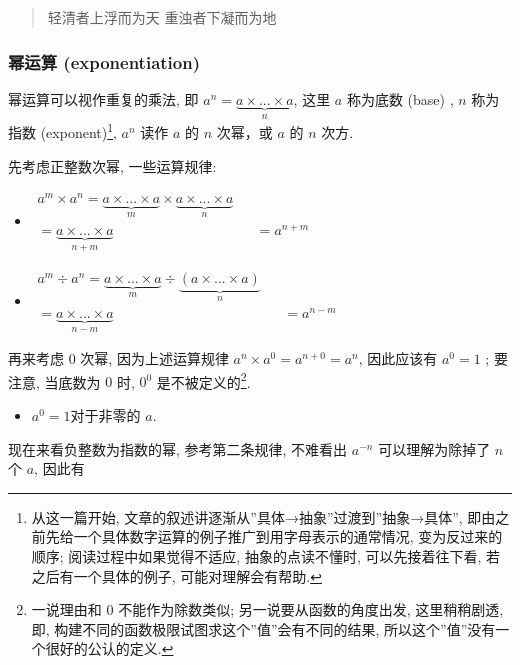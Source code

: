 \begin{quote}
轻清者上浮而为天 重浊者下凝而为地
\end{quote}

\hypertarget{ux5e42ux8fd0ux7b97-exponentiation}{%
\subsubsection{幂运算
(exponentiation)}\label{ux5e42ux8fd0ux7b97-exponentiation}}

幂运算可以视作重复的乘法, 即
\(a^n=\underbrace{a\times ...\times a}_{n}\), 这里 \(a\) 称为底数 (base)
, \(n\) 称为指数 (exponent)\footnote{从这一篇开始,
  文章的叙述讲逐渐从''具体→抽象''过渡到''抽象→具体'',
  即由之前先给一个具体数字运算的例子推广到用字母表示的通常情况,
  变为反过来的顺序; 阅读过程中如果觉得不适应, 抽象的点读不懂时,
  可以先接着往下看, 若之后有一个具体的例子, 可能对理解会有帮助.},
\(a^n\) 读作 \(a\) 的 \(n\) 次幂，或 \(a\) 的 \(n\) 次方.

先考虑正整数次幂, 一些运算规律:

\begin{itemize}
\tightlist
\item
  \(\begin{aligned}a^m\times a^n=\underbrace{a\times ...\times a}_{m}\times\underbrace{a\times ...\times a}_{n}&&\\  =\underbrace{a\times ...\times a}_{n+m}&&=a^{n+m}\end{aligned}\)
\item
  \(\begin{aligned}a^m\div a^n=\underbrace{a\times ...\times a}_{m}\div\underbrace{(a\times ...\times a)}_{n}&&\\  =\underbrace{a\times ...\times a}_{n-m}&&=a^{n-m}\end{aligned}\)
\end{itemize}

再来考虑 \(0\) 次幂, 因为上述运算规律 \(a^n\times a^0=a^{n+0}=a^n\),
因此应该有 \(a^0=1\) ; 要注意, 当底数为 \(0\) 时, \(0^0\)
是不被定义的\footnote{一说理由和 \(0\) 不能作为除数类似;
  另一说要从函数的角度出发, 这里稍稍剧透, 即,
  构建不同的函数极限试图求这个''值''会有不同的结果,
  所以这个''值''没有一个很好的公认的定义.}.

\begin{itemize}
\tightlist
\item
  \(a^0=1\)对于非零的 \(a\).
\end{itemize}

现在来看负整数为指数的幂, 参考第二条规律, 不难看出 \(a^{-n}\)
可以理解为除掉了 \(n\) 个 \(a\), 因此有


